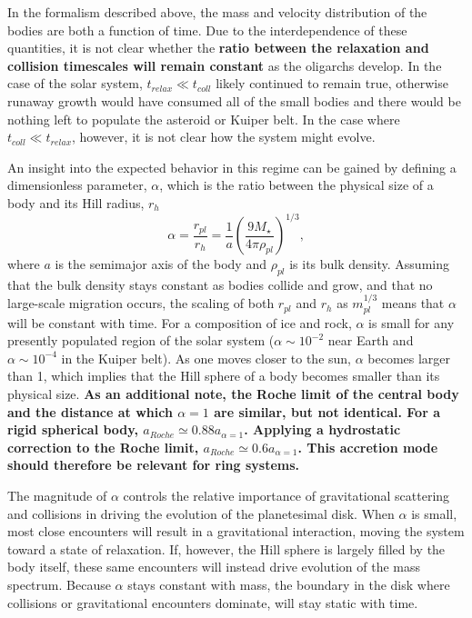 \documentclass[twocolumn,linenumbers]{aastex63}
\begin{document}
In the formalism described above, the mass and velocity distribution
of the bodies are both a function of time. Due to the interdependence
of these quantities, it is not clear whether the \textbf{ratio between the relaxation and collision timescales will remain constant} as the
oligarchs develop. In the case of the solar system, $t_{relax} \ll t_{coll}$ likely continued to remain true, otherwise runaway 
growth would have consumed all of the small bodies and there would be nothing left to populate the asteroid or Kuiper belt. In 
the case where $t_{coll} \ll t_{relax}$, however, it is not clear how the system might evolve.

An insight into the expected behavior in this regime can be gained by
defining a dimensionless parameter, $\alpha$, which is the ratio
between the physical size of a body and its Hill radius, $r_{h}$
\begin{equation}\label{eq:alpha}
	\alpha = \frac{r_{pl}}{r_{h}} = \frac{1}{a} \left( \frac{9 M_{\star}}{4 \pi \rho_{pl}} \right)^{1/3},
\end{equation}
where $a$ is the semimajor axis of the body and $\rho_{pl}$ is its
bulk density. Assuming that the bulk density stays constant as bodies collide and
grow, and that no large-scale migration occurs, the scaling of both
$r_{pl}$ and $r_{h}$ as $m_{pl}^{1/3}$ means that $\alpha$ will be
constant with time. For a composition of ice and rock, $\alpha$ is
small for any presently populated region of the solar system ($\alpha \sim
10^{-2}$ near Earth and $\alpha \sim 10^{-4}$ in the Kuiper belt). As
one moves closer to the sun, $\alpha$ becomes larger than 1, which
implies that the Hill sphere of a body becomes smaller than its physical size.
\textbf{As an additional note, the Roche limit of the central body and the distance at which $\alpha = 1$ are
similar, but not identical. For a rigid spherical body, $a_{Roche} \simeq 0.88 a_{\alpha = 1}$. Applying a hydrostatic correction to the Roche limit, $a_{Roche} \simeq 0.6 a_{\alpha = 1}$. This accretion mode should
therefore be relevant for ring systems.}

The magnitude of $\alpha$ controls the relative importance of gravitational scattering and collisions in driving the evolution of the planetesimal disk. When $\alpha$ is small, most close encounters will result in a gravitational interaction, moving the system toward a state of relaxation. If, however, the Hill sphere is largely filled by the body itself, these same encounters will instead drive evolution of the mass spectrum. Because $\alpha$ stays constant with mass, the boundary in the disk where collisions or gravitational encounters dominate, will stay static with time.
\end{document}
